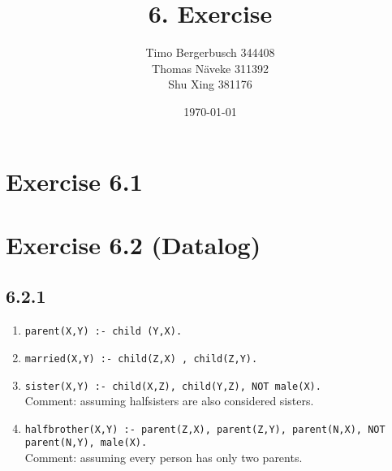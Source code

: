 \documentclass[12pt]{article}
\newcommand{\code}[1]{\texttt{#1}}
\begin{document}
	
	\title{6. Exercise}
	\author{Timo Bergerbusch 344408 \\ Thomas Näveke 311392 \\ Shu Xing 381176}
	\date{\specialdate\today}
	\maketitle
	
	\section*{Exercise 6.1}
	\section*{Exercise 6.2 (Datalog)}
	\subsection*{6.2.1}
		\begin{enumerate}[label=\alph*)]
			\item \code{parent(X,Y) :- child (Y,X).}
			\item \code{married(X,Y) :- child(Z,X) , child(Z,Y).}
			\item \code{sister(X,Y) :- child(X,Z), child(Y,Z), NOT male(X).} \\
				Comment: assuming halfsisters are also considered sisters.
			\item \code{halfbrother(X,Y) :- parent(Z,X), parent(Z,Y), parent(N,X), NOT parent(N,Y), male(X).}\\
				Comment: assuming every person has only two parents.
		\end{enumerate}
\end{document}

